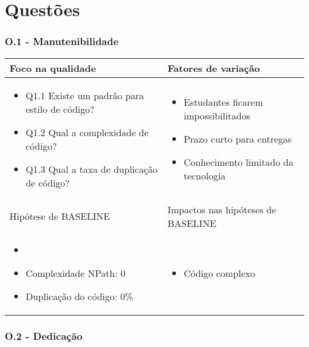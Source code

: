 \chapter{Questões}

\subsection{O.1 - Manutenibilidade}

	\begin{tabular}{ |p{6cm}|p{6cm}|  }
	 \hline
	 Foco na qualidade 		& 		Fatores de variação \\
	 \hline
	 \begin{itemize} \item Q1.1 Existe um padrão para estilo de código? \item Q1.2 Qual a complexidade de código? \item Q1.3 Qual a taxa de duplicação de código? \end{itemize} & \begin{itemize} \item Estudantes ficarem impossibilitados \item Prazo curto para entregas 
	 \item Conhecimento limitado da tecnologia \end{itemize}\\
	 \hline
	 Hipótese de BASELINE 		& 		Impactos nas hipóteses de BASELINE \\
	 \hline
	 \begin{itemize} \item \item Complexidade NPath: 0  \item Duplicação do código: 0\% \end{itemize} & \begin{itemize} \item Código complexo \end{itemize} \\
	 \hline
	\end{tabular}

\subsection{O.2 - Dedicação}

